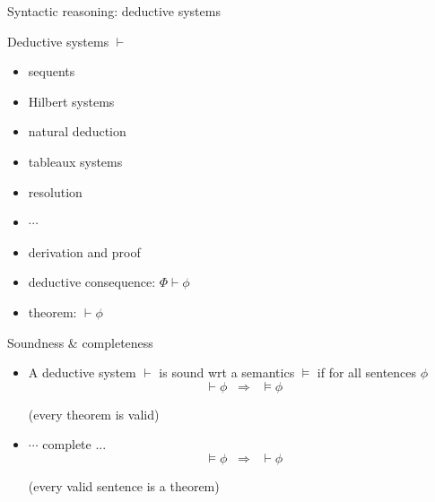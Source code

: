 \documentclass[aspectratio=169]{beamer}
\begin{document}
\begin{slide}{Syntactic reasoning: deductive systems}\label{s:3}
\small

\begin{block}{Deductive systems $\vdash$}
\begin{itemize}
\item sequents
\item Hilbert systems
\item natural deduction
\item tableaux systems
\item resolution
\item $\cdots$
\end{itemize}
\end{block}


\begin{flushright}
\begin{itemize}
\item \alert{derivation} and \alert{proof}
\item \alert{deductive consequence}: $\Phi \vdash \phi$
\item \alert{theorem}: $\vdash \phi$
\end{itemize}
\end{flushright}

\end{slide}

\begin{slide}{Soundness \& completeness}\label{s:4}
\small

\begin{itemize}
\item A deductive system $\vdash$ is \alert{sound} wrt a semantics $\models$ if for all sentences $\phi$
$$ \vdash \phi\; \; \Longrightarrow\; \; \models \phi$$
\begin{flushright}
(\alert{every theorem is valid})
\end{flushright}
\item $\cdots$ \alert{complete} ...
$$ \models \phi\; \;  \Longrightarrow\; \;  \vdash \phi$$
\begin{flushright}
(\alert{every valid sentence is a theorem})
\end{flushright}
 \end{itemize}

\end{slide}
\end{document}

